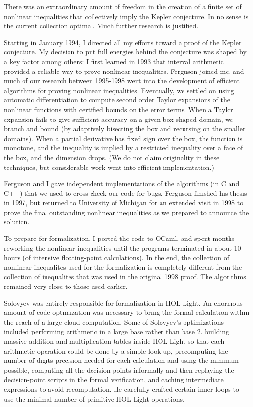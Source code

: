 \documentclass{amsart}
\begin{document}
There was an extraordinary amount of freedom in the creation
of a finite set of nonlinear inequalities that collectively imply
the Kepler conjecture.  In no sense is the current collection
optimal.  Much further research is justified.

Starting in January 1994, I directed all my efforts toward a proof of
the Kepler conjecture.  My decision to put full energies behind the
conjecture was shaped by a key factor among others: I first learned in
1993 that interval arithmetic provided a reliable way to prove
nonlinear inequalities.  Ferguson joined me, and much of our research
between 1995-1998 went into the development of efficient algorithms
for proving nonlinear inequalities.  Eventually, we settled on using
automatic differentiation to compute second order Taylor expansions of
the nonlinear functions with certified bounds on the error terms.
When a Taylor expansion fails to give sufficient accuracy on a given
box-shaped domain, we branch and bound (by adaptively bisecting the
box and recursing on the smaller domains).  When a partial derivative
has fixed sign over the box, the function is monotone, and the
inequality is implied by a restricted inequality over a face of the
box, and the dimension drops.  (We do not claim originality in these
techniques, but considerable work went into efficient implementation.)

Ferguson and I gave independent implementations of the algorithms (in
C and C++) that we used to cross-check our code for bugs. Ferguson
finished his thesis in 1997, but returned to University of Michigan
for an extended visit in 1998 to prove the final outstanding nonlinear
inequalities as we prepared to announce the solution.

To prepare for formalization, I ported the code to OCaml, and spent
months reworking the nonlinear inequalities until the programs
terminated in about 10 hours (of intensive floating-point
calculations).  In the end, the collection of nonlinear inequalites
used for the formalization is completely different from the collection
of inequalites that was used in the original 1998 proof.  The
algorithms remained very close to those used earlier.

Solovyev was entirely responsible for formalization in HOL Light.  An
enormous amount of code optimization was necessary to bring the formal
calculation within the reach of a large cloud computation.  Some of
Solovyev's optimizations included performing arithmetic in a large
base rather than base $2$, building massive addition and
multiplication tables inside HOL-Light so that each arithmetic
operation could be done by a simple look-up, precomputing the number
of digits precision needed for each calculation and using the minimum
possible, computing all the decision points informally and then
replaying the decision-point scripts in the formal verification, and
caching intermediate expressions to avoid recomputation.  He carefully
crafted certain inner loops to use the minimal number of primitive HOL
Light operations.
\end{document}
